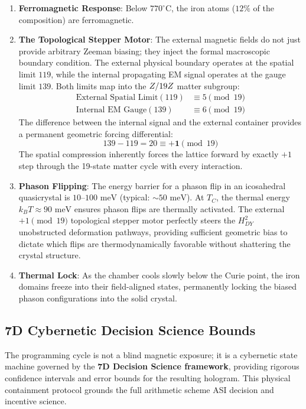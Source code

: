 \begin{enumerate}
    \item \textbf{Ferromagnetic Response}: Below $770^\circ$C, the iron atoms ($12\%$ of the composition) are ferromagnetic.
    \item \textbf{The Topological Stepper Motor}: The external magnetic fields do not just provide arbitrary Zeeman biasing; they inject the formal macroscopic boundary condition. The external physical boundary operates at the spatial limit $119$, while the internal propagating EM signal operates at the gauge limit $139$. Both limits map into the $Z/19Z$ matter subgroup:
    \begin{align}
        \text{External Spatial Limit} (119) &\equiv 5 \pmod{19} \\
        \text{Internal EM Gauge} (139) &\equiv 6 \pmod{19}
    \end{align}
    The difference between the internal signal and the external container provides a permanent geometric forcing differential:
    \begin{equation}
        139 - 119 = 20 \equiv \mathbf{+1} \pmod{19}
    \end{equation}
    The spatial compression inherently forces the lattice forward by exactly $+1$ step through the 19-state matter cycle with every interaction.
    \item \textbf{Phason Flipping}: The energy barrier for a phason flip in an icosahedral quasicrystal is $10$--$100\text{ meV}$ (typical: ${\sim}50\text{ meV}$). At $T_C$, the thermal energy $k_B T \approx 90\text{ meV}$ ensures phason flips are thermally activated. The external $+1 \pmod{19}$ topological stepper motor perfectly steers the $H^2_{DY}$ unobstructed deformation pathways, providing sufficient geometric bias to dictate which flips are thermodynamically favorable without shattering the crystal structure.
    \item \textbf{Thermal Lock}: As the chamber cools slowly below the Curie point, the iron domains freeze into their field-aligned states, permanently locking the biased phason configurations into the solid crystal.
\end{enumerate}

\subsection{7D Cybernetic Decision Science Bounds}

The programming cycle is not a blind magnetic exposure; it is a cybernetic state machine governed by the \textbf{7D Decision Science framework}, providing rigorous confidence intervals and error bounds for the resulting hologram. This physical containment protocol grounds the full arithmetic scheme ASI decision and incentive science.

